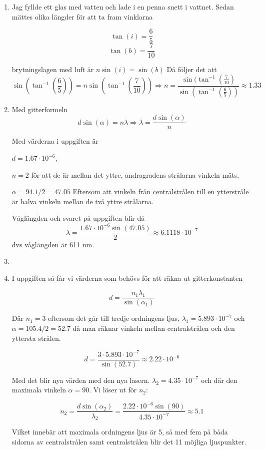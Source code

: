 \documentclass[a4paper,12pt]{article}
\begin{document}
\begin{enumerate}
    \item Jag fyllde ett glas med vatten och lade i en penna snett i vattnet. 
    Sedan mättes olika längder för att ta fram vinklarna

    $$\tan(i)=\frac{6}{5}$$
    $$\tan(b)=\frac{7}{10}$$

    brytningslagen med luft är $n\sin(i)=\sin(b)$
    Då följer det att 
    $$\sin(\tan^{-1}(\frac{6}{5}))=n\sin(\tan^{-1}(\frac{7}{10}))\Rightarrow n=\frac{\sin(\tan^{-1}(\frac{7}{10})}{\sin(\tan^{-1}(\frac{6}{5}))}\approx 1.33$$

    \item Med gitterformeln 
    $$d\sin(\alpha)=n\lambda\Rightarrow \lambda=\frac{d\sin(\alpha)}{n}$$

    Med värderna i uppgiften är 
    
    $d=1.67\cdot 10^{-6}$,

    $n=2$ för att de är mellan det yttre, andragradens strålarna vinkeln mäts,
    
    $\alpha = 94.1/2 = 47.05$ Eftersom att vinkeln från centralstrålen till en ytterstråle är halva vinkeln
    mellan de två yttre strålarna.

    Våglängden och svaret på uppgiften blir då
    $$\lambda=\frac{1.67\cdot 10^{-6}{\sin(47.05)}}{2}\approx 6.1118\cdot 10^{-7}$$
    dvs våglängden är 611 nm.

    \item 

    \item I uppgiften så får vi värderna som behövs för att räkna ut gitterkonstanten
    
    $$d=\frac{n_1\lambda_1}{\sin(\alpha_1)}$$

    Där $n_1=3$ eftersom det går till tredje ordningens ljus, 
    $\lambda_1=5.893\cdot 10^{-7}$ och $\alpha=105.4/2=52.7$ då
    man räknar vinkeln mellan centralstrålen och den yttersta strålen.

    $$d=\frac{3\cdot 5.893\cdot 10^{-7}}{\sin(52.7)}\approx 2.22\cdot 10^{-6}$$

    Med det blir nya värden med den nya lasern. $\lambda_2=4.35\cdot 10^{-7}$ och 
    där den maximala vinkeln $\alpha=90$. Vi löser ut för $n_2$:

    $$n_2=\frac{d\sin(\alpha_2)}{\lambda_2}=\frac{2.22\cdot 10^{-6}\sin(90)}{4.35\cdot 10^{-7}}\approx 5.1$$

    Vilket innebär att maximala ordningens ljus är 5, så med fem på båda sidorna av centralstrålen
    samt centralstrålen blir det 11 möjliga ljuspunkter.

\end{enumerate}
\end{document}
